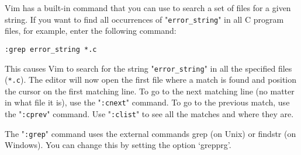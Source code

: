 Vim has a built-in command that you can use to search a set of files for a given string.
If you want to find all occurrences of "\verb!error_string!" in all C program files, for example, enter the following command:

\begin{Verbatim}[samepage=true]
 :grep error_string *.c
\end{Verbatim}

This causes Vim to search for the string "\verb!error_string!" in all the specified files (\verb!*.c!).
The editor will now open the first file where a match is found and position the cursor on the first matching line.
To go to the next matching line (no matter in what file it is), use the "\verb!:cnext!" command.
To go to the previous match, use the "\verb!:cprev!" command.
Use "\verb!:clist!" to see all the matches and where they are.

The "\verb!:grep!" command uses the external commands grep (on Unix) or findstr (on Windows).
You can change this by setting the option `grepprg'.
\clearpage
